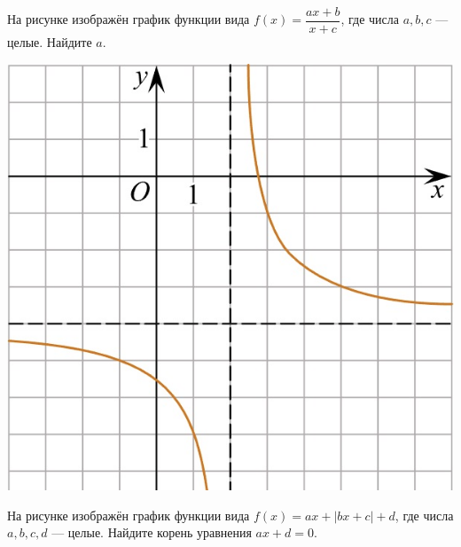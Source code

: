 \begin{homework}[number=2]
\begin{listofex}
\begin{minipage}[c]{0.1\textwidth}
		\end{minipage}
		\item
		\begin{minipage}[t]{0.43\textwidth}
			На рисунке изображён график функции вида \(f(x)=\dfrac{ax+b}{x+c}\), где числа \(a, b, c\) --- целые. Найдите \(a\).
		\end{minipage}
		\begin{minipage}[c]{0.1\textwidth}
			\includegraphics[align=t, width=\textwidth]{../pics/G101M4H2-11.jpg}
		\end{minipage}
		\newpage
		\item
		\begin{minipage}[t]{0.43\textwidth}
			На рисунке изображён график функции вида \(f(x)=ax+|bx+c|+d\), где числа \(a, b, c, d\) --- целые. Найдите корень уравнения \(ax+d=0\).
		\end{minipage}
		\begin{minipage}[c]{0.1\textwidth}

\end{minipage}
\end{listofex}
\end{homework}
